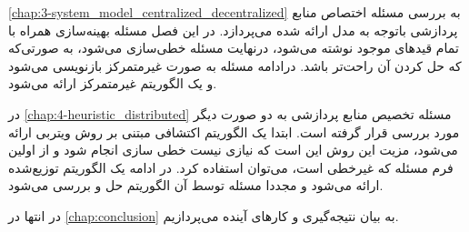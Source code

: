     \cref{chap:3-system_model_centralized_decentralized} به بررسی مسئله اختصاص منابع پردازشی باتوجه به مدل ارائه شده می‌پردازد.
    در این فصل مسئله بهینه‌سازی همراه با تمام قیدهای موجود نوشته می‌شود، درنهایت مسئله خطی‌سازی می‌شود، به صورتی‌که که حل کردن آن راحت‌تر باشد. 
    درادامه مسئله به صورت غیرمتمرکز بازنویسی می‌شود و یک الگوریتم غیرمتمرکز ارائه می‌شود. 

    در \cref{chap:4-heuristic_distributed} مسئله تخصیص منابع پردازشی به دو صورت دیگر مورد بررسی قرار گرفته است.
    ابتدا یک الگوریتم اکتشافی مبتنی بر روش ویتربی ارائه می‌شود، مزیت این روش این است که نیازی نیست خطی سازی انجام شود و از اولین فرم مسئله که غیرخطی است، می‌توان استفاده کرد. 
    در ادامه یک الگوریتم توزیع‌شده ارائه می‌شود و مجددا مسئله توسط آن الگوریتم حل و بررسی می‌شود. 

    در انتها در \cref{chap:conclusion} به بیان نتیجه‌گیری و کار‌های آینده می‌پردازیم.